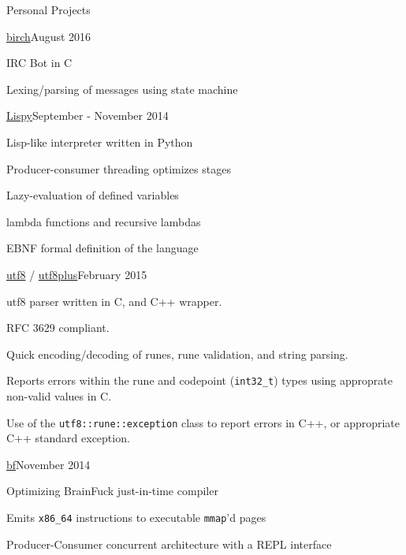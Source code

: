 \documentclass{resume} %
\begin{document}
\begin{rSection}{Personal Projects}

\begin{rSubsection}{\href{http://github.com/cptaffe/birch}{birch}}{August 2016}{}{}

	\item IRC Bot in C
	\item Lexing/parsing of messages using state machine
\end{rSubsection}

\begin{rSubsection}{\href{http://github.com/cptaffe/lispy}{Lispy}}{September - November 2014}{}{}

	\item Lisp-like interpreter written in Python
	\item Producer-consumer threading optimizes stages
	\item Lazy-evaluation of defined variables
	\item lambda functions and recursive lambdas
	\item EBNF formal definition of the language
\end{rSubsection}

\begin{rSubsection}{\href{http://github.com/cptaffe/utf8}{utf8} / \href{http://github.com/cptaffe/utf8plus}{utf8plus}}{February 2015}{}{}

	\item utf8 parser written in C, and C++ wrapper.
	\item RFC 3629 compliant.
	\item Quick encoding/decoding of runes, rune validation, and string parsing.
	\item Reports errors within the rune and codepoint ({\tt int32\_t}) types using approprate non-valid values in C.
	\item Use of the \verb!utf8::rune::exception! class to report errors in C++, or appropriate C++ standard exception.
\end{rSubsection}

\begin{rSubsection}{\href{http://github.com/cptaffe/bf}{bf}}{November 2014}{}{}

	\item Optimizing BrainFuck just-in-time compiler
	\item Emits {\tt x86\_64} instructions to executable {\tt mmap}'d pages
	\item Producer-Consumer concurrent architecture with a REPL interface
\end{rSubsection}

\end{rSection}
\end{document}
